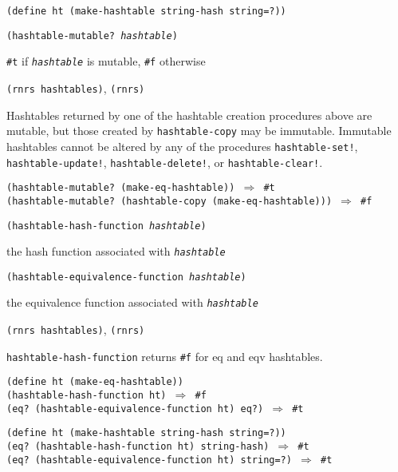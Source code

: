 \texttt{(define ht (make-hashtable string-hash string=?))}
\begin{description}

\label{objects_s277}\item[procedure] \texttt{(hashtable-mutable? \textit{hashtable})}



\item[returns] \texttt{\#{}t} if \texttt{\textit{hashtable}} is mutable, \texttt{\#{}f} otherwise


\item[libraries] \texttt{(rnrs hashtables)}, \texttt{(rnrs)}
\end{description}


Hashtables returned by one of the hashtable creation procedures above are
mutable, but those created by \texttt{hashtable-copy} may be immutable.
Immutable hashtables cannot be altered by any of the procedures
\texttt{hashtable-set!}, \texttt{hashtable-update!},
\texttt{hashtable-delete!}, or \texttt{hashtable-clear!}.


\begin{alltt}
(hashtable-mutable? (make-eq-hashtable)) \(\Rightarrow\) \#{}t
(hashtable-mutable? (hashtable-copy (make-eq-hashtable))) \(\Rightarrow\) \#{}f
\end{alltt}

\begin{description}

\label{objects_s278}\item[procedure] \texttt{(hashtable-hash-function \textit{hashtable})}



\item[returns] the hash function associated with \texttt{\textit{hashtable}}


\item[procedure] \texttt{(hashtable-equivalence-function \textit{hashtable})}



\item[returns] the equivalence function associated with \texttt{\textit{hashtable}}


\item[libraries] \texttt{(rnrs hashtables)}, \texttt{(rnrs)}
\end{description}

\texttt{hashtable-hash-function} returns \texttt{\#{}f} for eq and eqv hashtables.

\begin{alltt}
(define ht (make-eq-hashtable))
(hashtable-hash-function ht) \(\Rightarrow\) \#{}f
(eq? (hashtable-equivalence-function ht) eq?) \(\Rightarrow\) \#{}t

(define ht (make-hashtable string-hash string=?))
(eq? (hashtable-hash-function ht) string-hash) \(\Rightarrow\) \#{}t
(eq? (hashtable-equivalence-function ht) string=?) \(\Rightarrow\) \#{}t
\end{alltt}

